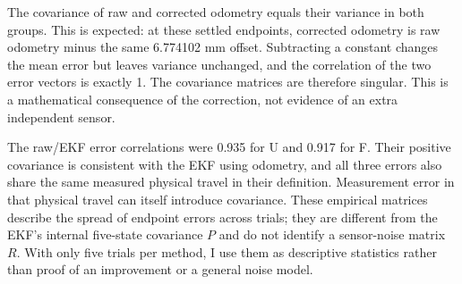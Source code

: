 The covariance of raw and corrected odometry equals their variance in both groups. This is expected: at these settled endpoints, corrected odometry is raw odometry minus the same 6.774102 mm offset. Subtracting a constant changes the mean error but leaves variance unchanged, and the correlation of the two error vectors is exactly 1. The covariance matrices are therefore singular. This is a mathematical consequence of the correction, not evidence of an extra independent sensor.

The raw/EKF error correlations were 0.935 for U and 0.917 for F. Their positive covariance is consistent with the EKF using odometry, and all three errors also share the same measured physical travel in their definition. Measurement error in that physical travel can itself introduce covariance. These empirical matrices describe the spread of endpoint errors across trials; they are different from the EKF's internal five-state covariance $P$ and do not identify a sensor-noise matrix $R$. With only five trials per method, I use them as descriptive statistics rather than proof of an improvement or a general noise model.
